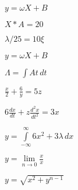\documentclass[12pt]{report}
\begin{document}
\vspace*{\fill}
\begin{center}
    \(
        y = \omega X + B
    \)
\end{center}
\vfill

\vspace*{\fill}
\begin{center}
    \(
    X*A=20
    \)
\end{center}
\vfill

\newpage

\vspace*{\fill}
\begin{center}
    \(
    \lambda/25 = 10\xi
    \)
\end{center}
\vfill

\vspace*{\fill}
\begin{center}
    \(
    y = \omega X + B
    \)
\end{center}
\vfill

\newpage

\vspace*{\fill}
\begin{center}
    \(
    \Lambda = \int A t\, dt
    \)
\end{center}
\vfill

\vspace*{\fill}
\begin{center}
    \(
    \frac{x}{2} + \frac{6}{y} = 5z
    \)
\end{center}
\vfill

\newpage

\vspace*{\fill}
\begin{center}
    \(
    6\frac{dx}{dt}+z\frac{d^2x}{dt^2} = 3x
    \)
\end{center}
\vfill

\vspace*{\fill}
\begin{center}
    \(
    y = \int\limits_{-\infty}^{\infty}6x^2+3\lambda\, dx
    \)
\end{center}
\vfill

\newpage

\vspace*{\fill}
\begin{center}
    \(
    y = \lim\limits_{n\to 0}\frac{x}{x}
    \)
\end{center}
\vfill

\vspace*{\fill}
\begin{center}
	\(
	y = \sqrt{x^2 + y^{n-1}}
	\)
\end{center}
\vfill
\end{document}
